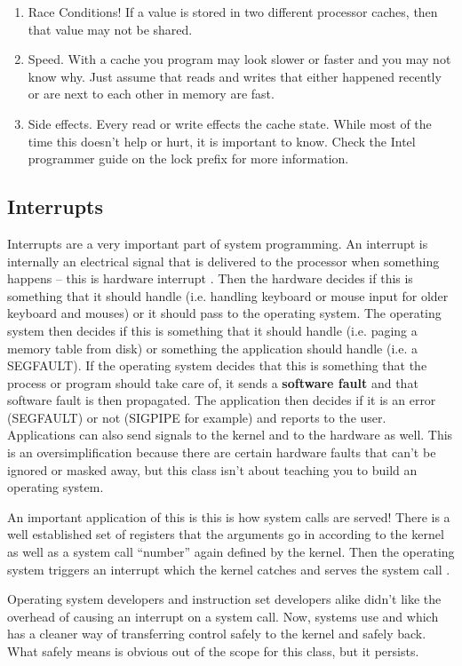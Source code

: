 \begin{enumerate}
\item Race Conditions! If a value is stored in two different processor caches, then that value may not be shared.
\item Speed. With a cache you program may look slower or faster and you may not know why. Just assume that reads and writes that either happened recently or are next to each other in memory are fast.
\item Side effects. Every read or write effects the cache state. While most of the time this doesn't help or hurt, it is important to know. Check the Intel programmer guide on the lock prefix for more information.
\end{enumerate}

\subsection{Interrupts}

Interrupts are a very important part of system programming.
An interrupt is internally an electrical signal that is delivered to the processor when something happens -- this is hardware interrupt \cite{redhat_hardware_int}.
Then the hardware decides if this is something that it should handle (i.e. handling keyboard or mouse input for older keyboard and mouses) or it should pass to the operating system.
The operating system then decides if this is something that it should handle (i.e. paging a memory table from disk) or something the application should handle (i.e. a SEGFAULT).
If the operating system decides that this is something that the process or program should take care of, it sends a \textbf{software fault} and that software fault is then propagated.
The application then decides if it is an error (SEGFAULT) or not (SIGPIPE for example) and reports to the user.
Applications can also send signals to the kernel and to the hardware as well.
This is an oversimplification because there are certain hardware faults that can't be ignored or masked away, but this class isn't about teaching you to build an operating system.

An important application of this is this is how system calls are served!
There is a well established set of registers that the arguments go in according to the kernel as well as a system call ``number'' again defined by the kernel.
Then the operating system triggers an interrupt which the kernel catches and serves the system call \cite{garg_2006}.

Operating system developers and instruction set developers alike didn't like the overhead of causing an interrupt on a system call. Now, systems use  and  which has a cleaner way of transferring control safely to the kernel and safely back.
What safely means is obvious out of the scope for this class, but it persists.
